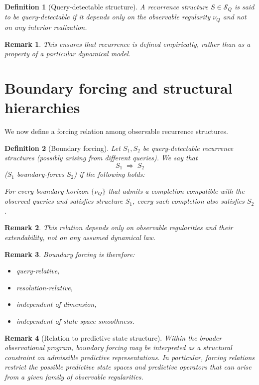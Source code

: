 \documentclass[11pt]{article}
\newtheorem{definition}{Definition}
\newtheorem{remark}{Remark}
\begin{document}
\begin{definition}[Query-detectable structure]
A recurrence structure $S\in\mathcal S_Q$ is said to be
\emph{query-detectable} if it depends only on the observable regularity
$\nu_Q$ and not on any interior realization.
\end{definition}

\begin{remark}
This ensures that recurrence is defined empirically, rather than as a
property of a particular dynamical model.
\end{remark}

\section{Boundary forcing and structural hierarchies}

We now define a forcing relation among observable recurrence structures.

\begin{definition}[Boundary forcing]
Let $S_1,S_2$ be query-detectable recurrence structures (possibly arising
from different queries). We say that
\[
S_1 \;\Rightarrow\; S_2
\]
(\emph{$S_1$ boundary-forces $S_2$}) if the following holds:

For every boundary horizon $\{\nu_Q\}$ that admits a completion compatible
with the observed queries and satisfies structure $S_1$, every such completion
also satisfies $S_2$.
\end{definition}

\begin{remark}
This relation depends only on observable regularities and their
extendability, not on any assumed dynamical law.
\end{remark}

\begin{remark}
Boundary forcing is therefore:
\begin{itemize}
\item query-relative,
\item resolution-relative,
\item independent of dimension,
\item independent of state-space smoothness.
\end{itemize}
\end{remark}

\begin{remark}[Relation to predictive state structure]
Within the broader observational program, boundary forcing may be
interpreted as a structural constraint on admissible predictive
representations.  In particular, forcing relations restrict the
possible predictive state spaces and predictive operators that can
arise from a given family of observable regularities.
\end{remark}
\end{document}
